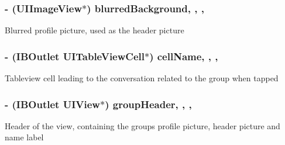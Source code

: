 \subsubsection[{blurred\+Background}]{\setlength{\rightskip}{0pt plus 5cm}-\/ (U\+I\+Image\+View$\ast$) blurred\+Background\hspace{0.3cm}{\ttfamily [read]}, {\ttfamily [write]}, {\ttfamily [nonatomic]}, {\ttfamily [strong]}}\label{category_e_s_group_settings_view_07_08_a54aa2404914ccfdf262cf4f2c8c881c2}
Blurred profile picture, used as the header picture \hypertarget{category_e_s_group_settings_view_07_08_a87e46348254b12e096f8e18c7b65435a}{}
\subsubsection[{cell\+Name}]{\setlength{\rightskip}{0pt plus 5cm}-\/ (I\+B\+Outlet U\+I\+Table\+View\+Cell$\ast$) cell\+Name\hspace{0.3cm}{\ttfamily [read]}, {\ttfamily [write]}, {\ttfamily [nonatomic]}, {\ttfamily [strong]}}\label{category_e_s_group_settings_view_07_08_a87e46348254b12e096f8e18c7b65435a}
Tableview cell leading to the conversation related to the group when tapped \hypertarget{category_e_s_group_settings_view_07_08_a264985de394ae9e3e1fb7755e0871207}{}
\subsubsection[{group\+Header}]{\setlength{\rightskip}{0pt plus 5cm}-\/ (I\+B\+Outlet U\+I\+View$\ast$) group\+Header\hspace{0.3cm}{\ttfamily [read]}, {\ttfamily [write]}, {\ttfamily [nonatomic]}, {\ttfamily [strong]}}\label{category_e_s_group_settings_view_07_08_a264985de394ae9e3e1fb7755e0871207}
Header of the view, containing the group\textquotesingle{}s profile picture, header picture and name label \hypertarget{category_e_s_group_settings_view_07_08_af9c9b0aeed690eb221a0450772472e6b}{}
